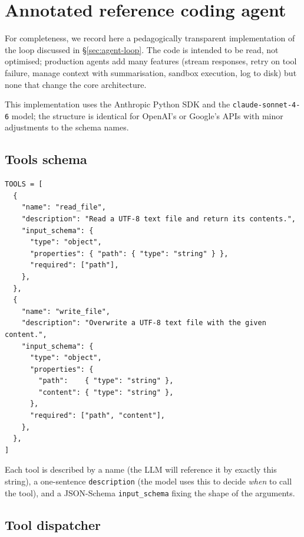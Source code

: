 
\appendix
\section{Annotated reference coding agent}\label{sec:appendix-agent}

For completeness, we record here a pedagogically transparent
implementation of the loop discussed in
\S\ref{sec:agent-loop}.  The code is intended to be read,
not optimised; production agents add many features (stream
responses, retry on tool failure, manage context with
summarisation, sandbox execution, log to disk) but none
that change the core architecture.

This implementation uses the Anthropic Python SDK and the
\texttt{claude-sonnet-4-6} model; the structure is identical
for OpenAI's or Google's APIs with minor adjustments to the
schema names.

\subsection{Tools schema}

\begin{lstlisting}
TOOLS = [
  {
    "name": "read_file",
    "description": "Read a UTF-8 text file and return its contents.",
    "input_schema": {
      "type": "object",
      "properties": { "path": { "type": "string" } },
      "required": ["path"],
    },
  },
  {
    "name": "write_file",
    "description": "Overwrite a UTF-8 text file with the given content.",
    "input_schema": {
      "type": "object",
      "properties": {
        "path":    { "type": "string" },
        "content": { "type": "string" },
      },
      "required": ["path", "content"],
    },
  },
]
\end{lstlisting}

Each tool is described by a name (the LLM will reference it
by exactly this string), a one-sentence \texttt{description}
(the model uses this to decide \emph{when} to call the tool),
and a JSON-Schema \texttt{input\_schema} fixing the shape
of the arguments.

\subsection{Tool dispatcher}

